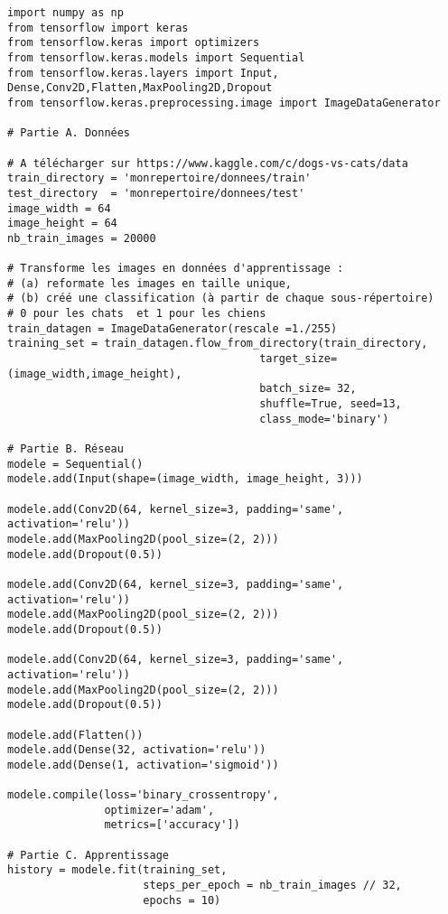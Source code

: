\documentclass[11pt,class=report,crop=false]{standalone}
\begin{document}
\begin{lstlisting}
import numpy as np
from tensorflow import keras
from tensorflow.keras import optimizers
from tensorflow.keras.models import Sequential
from tensorflow.keras.layers import Input, Dense,Conv2D,Flatten,MaxPooling2D,Dropout
from tensorflow.keras.preprocessing.image import ImageDataGenerator

# Partie A. Données

# A télécharger sur https://www.kaggle.com/c/dogs-vs-cats/data
train_directory = 'monrepertoire/donnees/train'
test_directory  = 'monrepertoire/donnees/test'
image_width = 64
image_height = 64
nb_train_images = 20000

# Transforme les images en données d'apprentissage : 
# (a) reformate les images en taille unique, 
# (b) créé une classification (à partir de chaque sous-répertoire) 
# 0 pour les chats  et 1 pour les chiens 
train_datagen = ImageDataGenerator(rescale =1./255)
training_set = train_datagen.flow_from_directory(train_directory,
                                       target_size=(image_width,image_height),
                                       batch_size= 32,
                                       shuffle=True, seed=13,
                                       class_mode='binary')

# Partie B. Réseau 
modele = Sequential()
modele.add(Input(shape=(image_width, image_height, 3)))

modele.add(Conv2D(64, kernel_size=3, padding='same', activation='relu'))
modele.add(MaxPooling2D(pool_size=(2, 2)))
modele.add(Dropout(0.5))

modele.add(Conv2D(64, kernel_size=3, padding='same', activation='relu'))
modele.add(MaxPooling2D(pool_size=(2, 2)))
modele.add(Dropout(0.5))

modele.add(Conv2D(64, kernel_size=3, padding='same', activation='relu'))
modele.add(MaxPooling2D(pool_size=(2, 2)))
modele.add(Dropout(0.5))

modele.add(Flatten())
modele.add(Dense(32, activation='relu'))
modele.add(Dense(1, activation='sigmoid'))

modele.compile(loss='binary_crossentropy',
               optimizer='adam',
               metrics=['accuracy'])

# Partie C. Apprentissage
history = modele.fit(training_set,
                     steps_per_epoch = nb_train_images // 32,
                     epochs = 10)

\end{lstlisting}
\end{document}
